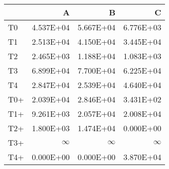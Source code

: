 \begin{tabular}{lrrr}
\toprule
     &           A &           B &           C \\
\midrule
 T0  &   \num{4.537E+04} &   \num{5.667E+04} &   \num{6.776E+03} \\
 T1  &   \num{2.513E+04} &   \num{4.150E+04} &   \num{3.445E+04} \\
 T2  &   \num{2.465E+03} &   \num{1.188E+04} &   \num{1.083E+03} \\
 T3  &   \num{6.899E+04} &   \num{7.700E+04} &   \num{6.225E+04} \\
 T4  &   \num{2.847E+04} &   \num{2.539E+04} &   \num{4.640E+04} \\
 T0+ &   \num{2.039E+04} &   \num{2.846E+04} &   \num{3.431E+02} \\
 T1+ &   \num{9.261E+03} &   \num{2.057E+04} &   \num{2.008E+04} \\
 T2+ &   \num{1.800E+03} &   \num{1.474E+04} &   \num{0.000E+00} \\
 T3+ &$\infty$        &$\infty$        &$\infty$        \\
 T4+ &   \num{0.000E+00} &   \num{0.000E+00} &   \num{3.870E+04} \\
\bottomrule
\end{tabular}